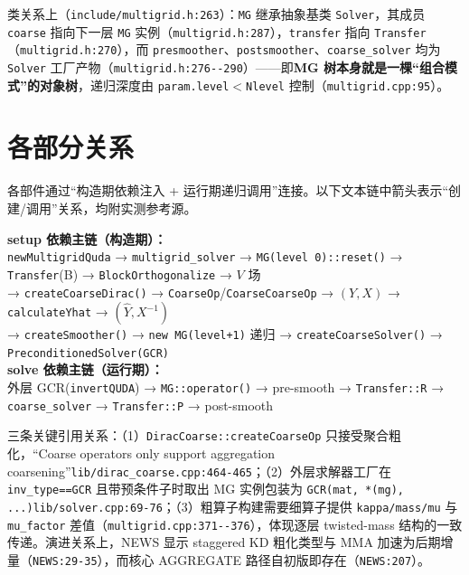 \documentclass[UTF8]{ctexart}
\begin{document}
类关系上（\textcolor{evidence}{\texttt{\nolinkurl{include/multigrid.h:263}}}）：\texttt{MG} 继承抽象基类 \texttt{Solver}，其成员 \texttt{coarse} 指向下一层 \texttt{MG} 实例（\textcolor{evidence}{\texttt{\nolinkurl{multigrid.h:287}}}），\texttt{transfer} 指向 \texttt{Transfer}（\textcolor{evidence}{\texttt{\nolinkurl{multigrid.h:270}}}），而 \texttt{presmoother}、\texttt{postsmoother}、\texttt{coarse\_solver} 均为 \texttt{Solver} 工厂产物（\textcolor{evidence}{\texttt{\nolinkurl{multigrid.h:276--290}}}）——即\textbf{MG 树本身就是一棵``组合模式''的对象树}，递归深度由 \texttt{param.level}$<$\texttt{Nlevel} 控制（\textcolor{evidence}{\texttt{\nolinkurl{multigrid.cpp:95}}}）。

\section{各部分关系}

各部件通过``构造期依赖注入 + 运行期递归调用''连接。以下文本链中箭头表示``创建/调用''关系，均附实测参考源。

\begin{keybox}
\textbf{setup 依赖主链（构造期）：}\\
\textcolor{relation}{\texttt{newMultigridQuda} → \texttt{multigrid\_solver} → \texttt{MG(level 0)::reset()} → \texttt{Transfer}(B) → \texttt{BlockOrthogonalize} → $V$ 场}\\
\textcolor{relation}{\hspace*{4em}→ \texttt{createCoarseDirac()} → \texttt{CoarseOp}/\texttt{CoarseCoarseOp} → $(Y,X)$ → \texttt{calculateYhat} → $(\hat Y,X^{-1})$}\\
\textcolor{relation}{\hspace*{4em}→ \texttt{createSmoother()} → \texttt{new MG(level+1)} 递归 → \texttt{createCoarseSolver()} → \texttt{PreconditionedSolver(GCR)}}\\[0.5em]
\textbf{solve 依赖主链（运行期）：}\\
\textcolor{relation}{外层 GCR(\texttt{invertQUDA}) → \texttt{MG::operator()} → pre-smooth → \texttt{Transfer::R} → \texttt{coarse\_solver} → \texttt{Transfer::P} → post-smooth}
\end{keybox}

三条关键引用关系：（1）\texttt{DiracCoarse::createCoarseOp} 只接受聚合粗化，``Coarse operators only support aggregation coarsening''\textcolor{evidence}{\texttt{\nolinkurl{lib/dirac_coarse.cpp:464-465}}}；（2）外层求解器工厂在 \texttt{inv\_type==GCR} 且带预条件子时取出 MG 实例包装为 \texttt{GCR(mat, *(mg), ...)}\textcolor{evidence}{\texttt{\nolinkurl{lib/solver.cpp:69-76}}}；（3）粗算子构建需要细算子提供 \texttt{kappa/mass/mu} 与 \texttt{mu\_factor} 差值（\textcolor{evidence}{\texttt{\nolinkurl{multigrid.cpp:371--376}}}），体现逐层 twisted-mass 结构的一致传递。演进关系上，NEWS 显示 staggered KD 粗化类型与 MMA 加速为后期增量（\texttt{\nolinkurl{NEWS:29-35}}），而核心 AGGREGATE 路径自初版即存在（\texttt{\nolinkurl{NEWS:207}}）。
\end{document}
